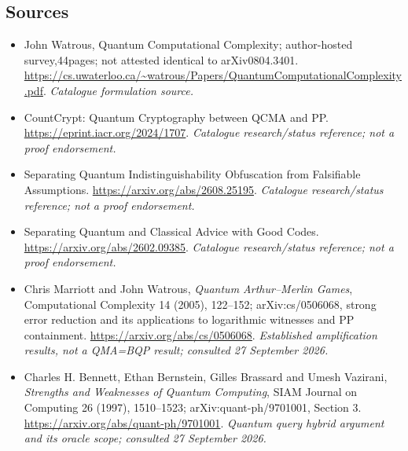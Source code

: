 \documentclass[11pt,a4paper]{article}
\numberwithin{equation}{section}
\begin{document}
\subsection{Sources}
\begin{itemize}\raggedright
\item[\textnormal{[S1]}]\hypertarget{source:statement:1}{} John Watrous, Quantum Computational Complexity; author-hosted survey,44pages; not attested identical to arXiv0804.3401.
\url{https://cs.uwaterloo.ca/~watrous/Papers/QuantumComputationalComplexity.pdf}.
{\small\textit{Catalogue formulation source.}}
\item[\textnormal{[S2]}]\hypertarget{source:statement:2}{} CountCrypt: Quantum Cryptography between QCMA and PP.
\url{https://eprint.iacr.org/2024/1707}.
{\small\textit{Catalogue research/status reference; not a proof endorsement.}}
\item[\textnormal{[S3]}]\hypertarget{source:statement:3}{} Separating Quantum Indistinguishability Obfuscation from Falsifiable Assumptions.
\url{https://arxiv.org/abs/2608.25195}.
{\small\textit{Catalogue research/status reference; not a proof endorsement.}}
\item[\textnormal{[S4]}]\hypertarget{source:statement:4}{} Separating Quantum and Classical Advice with Good Codes.
\url{https://arxiv.org/abs/2602.09385}.
{\small\textit{Catalogue research/status reference; not a proof endorsement.}}
\item[\textnormal{[E1]}]\hypertarget{extra:statement:1}{} Chris Marriott and
John Watrous, \emph{Quantum Arthur--Merlin Games}, Computational Complexity
14 (2005), 122--152; arXiv:cs/0506068, strong error reduction and its
applications to logarithmic witnesses and PP containment.
\url{https://arxiv.org/abs/cs/0506068}.
{\small\textit{Established amplification results, not a QMA=BQP result;
consulted 27 September 2026.}}
\item[\textnormal{[E2]}]\hypertarget{extra:statement:2}{} Charles H. Bennett,
Ethan Bernstein, Gilles Brassard and Umesh Vazirani,
\emph{Strengths and Weaknesses of Quantum Computing}, SIAM Journal on
Computing 26 (1997), 1510--1523; arXiv:quant-ph/9701001, Section 3.
\url{https://arxiv.org/abs/quant-ph/9701001}.
{\small\textit{Quantum query hybrid argument and its oracle scope;
consulted 27 September 2026.}}
\end{itemize}
\end{document}
